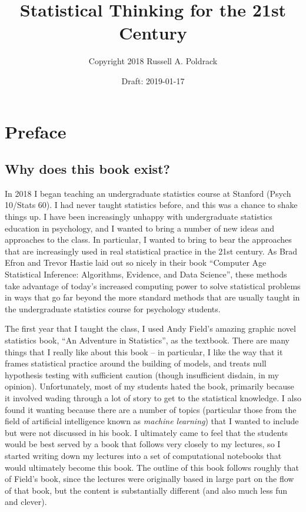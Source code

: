 \documentclass[]{book}
\title{Statistical Thinking for the 21st Century}
\author{Copyright 2018 Russell A. Poldrack}
\date{Draft: 2019-01-17}
\theoremstyle{definition}
\theoremstyle{definition}
\theoremstyle{definition}
\theoremstyle{remark}
\begin{document}
\maketitle

{
\setcounter{tocdepth}{1}
\tableofcontents
}
\chapter*{Preface}\label{preface}

\section{Why does this book exist?}\label{why-does-this-book-exist}

In 2018 I began teaching an undergraduate statistics course at Stanford
(Psych 10/Stats 60). I had never taught statistics before, and this was
a chance to shake things up. I have been increasingly unhappy with
undergraduate statistics education in psychology, and I wanted to bring
a number of new ideas and approaches to the class. In particular, I
wanted to bring to bear the approaches that are increasingly used in
real statistical practice in the 21st century. As Brad Efron and Trevor
Hastie laid out so nicely in their book ``Computer Age Statistical
Inference: Algorithms, Evidence, and Data Science'', these methods take
advantage of today's increased computing power to solve statistical
problems in ways that go far beyond the more standard methods that are
usually taught in the undergraduate statistics course for psychology
students.

The first year that I taught the class, I used Andy Field's amazing
graphic novel statistics book, ``An Adventure in Statistics'', as the
textbook. There are many things that I really like about this book -- in
particular, I like the way that it frames statistical practice around
the building of models, and treats null hypothesis testing with
sufficient caution (though insufficient disdain, in my opinion).
Unfortunately, most of my students hated the book, primarily because it
involved wading through a lot of story to get to the statistical
knowledge. I also found it wanting because there are a number of topics
(particular those from the field of artificial intelligence known as
\emph{machine learning}) that I wanted to include but were not discussed
in his book. I ultimately came to feel that the students would be best
served by a book that follows very closely to my lectures, so I started
writing down my lectures into a set of computational notebooks that
would ultimately become this book. The outline of this book follows
roughly that of Field's book, since the lectures were originally based
in large part on the flow of that book, but the content is substantially
different (and also much less fun and clever).
\end{document}
